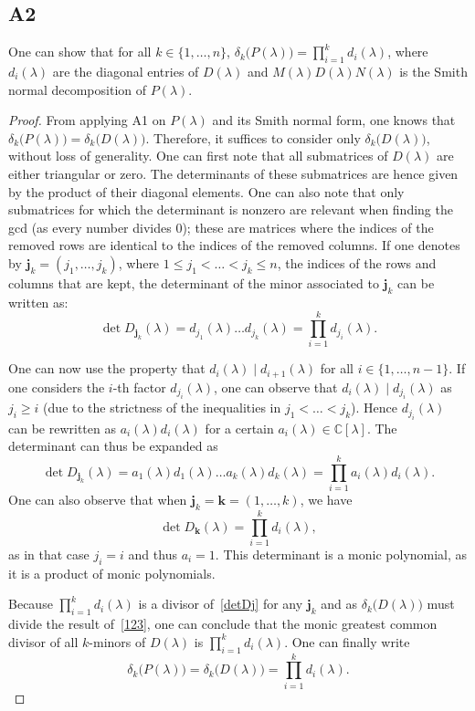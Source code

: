 \documentclass[11pt]{article}
\newcommand{\complex}{\mathbb{C}} %
\begin{document}
\subsection*{A2}
One can show that for all $k\in\{1,\dots,n\}$, $\delta_k\big(P(\lambda)\big)=\prod_{i=1}^k d_i(\lambda)$, where $d_i(\lambda)$ are the diagonal entries of $D(\lambda)$ and $M(\lambda)D(\lambda)N(\lambda)$ is the Smith normal decomposition of $P(\lambda)$.
\begin{proof}
From applying A1 on \(P(\lambda)\) and its Smith normal form, one knows that $\delta_k\big(P(\lambda)\big)=\delta_k\big(D(\lambda)\big)$.
Therefore, it suffices to consider only $\delta_k\big(D(\lambda)\big)$, without loss of generality.
One can first note that all submatrices of $D(\lambda)$ are either triangular or zero. The determinants of these submatrices are hence given by the product of their diagonal elements.
One can also note that only submatrices for which the determinant is nonzero are relevant when finding the gcd (as every number divides \(0\)); these are matrices where the indices of the removed rows are identical to the indices of the removed columns.
If one denotes by $\bm{j}_k=(j_1,\dots,j_k)$, where $1 \leqslant j_1< \dots <j_k \leqslant n$, the indices of the rows and columns that are kept, the determinant of the minor associated to $\bm{j}_k$ can be written as:
\[
    \det D_{\bm{j}_k}(\lambda)=d_{j_1}(\lambda) \dots d_{j_k}(\lambda) = \prod_{i = 1}^{k} d_{j_i}(\lambda).
\]

One can now use the property that $d_i(\lambda) \mid d_{i+1}(\lambda)$ for all $i\in\{1,\dots,n-1\}$.
If one considers the $i$-th factor $d_{j_i}(\lambda)$, one can observe that $d_i(\lambda) \mid d_{j_i}(\lambda)$ as $j_i \geqslant i$ (due to the strictness of the inequalities in $j_1<\dots<j_k$). Hence $d_{j_i}(\lambda)$ can be rewritten as $a_{i}(\lambda)d_i(\lambda)$ for a certain $a_{i}(\lambda)\in\complex[\lambda]$. The determinant can thus be expanded as
\begin{equation}\label{detDj}
    \det D_{\bm{j}_k}(\lambda)=a_{1}(\lambda) d_1(\lambda) \dots a_{k}(\lambda)d_{k}(\lambda) = \prod_{i=1}^k a_{i}(\lambda) d_i(\lambda).
\end{equation}
One can also observe that when $\bm{j}_k=\bm{k} = (1,\dots,k)$, we have
\begin{equation}\label{123}
    \det D_{\bm{k}}(\lambda)=\prod_{i=1}^k d_i(\lambda),
\end{equation}
as in that case \(j_i = i\) and thus \(a_{i} = 1\).
This determinant is a monic polynomial, as it is a product of monic polynomials.

Because $\prod_{i=1}^k d_i(\lambda)$ is a divisor of~\eqref{detDj} for any $\bm{j}_k$ and as $\delta_k\big(D(\lambda)\big)$ must divide the result of~\eqref{123}, one can conclude that the monic greatest common divisor of all \(k\)-minors of $D(\lambda)$ is $\prod_{i=1}^k d_i(\lambda)$.
One can finally write
\begin{equation}\label{A21}
    \delta_k\big(P(\lambda)\big)=\delta_k\big(D(\lambda)\big)=\prod_{i=1}^k d_i(\lambda).
\end{equation}
\end{proof}
\end{document}
